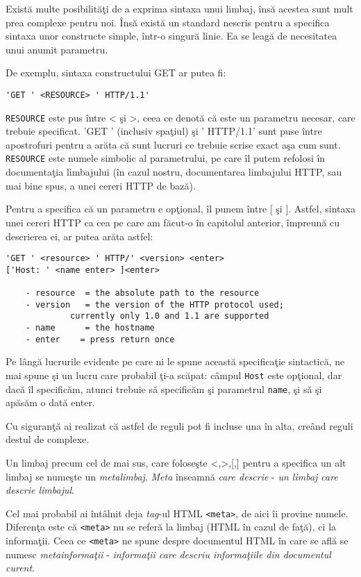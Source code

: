 Există multe posibilităţi de a exprima sintaxa unui limbaj, însă acestea
sunt mult prea complexe pentru noi. Însă există un standard nescris
pentru a specifica sintaxa unor constructe simple, într-o singură linie.
Ea se leagă de necesitatea unui anumit parametru.

De exemplu, sintaxa constructului GET ar putea fi:\\
\begin{verbatim}'GET ' <RESOURCE> ' HTTP/1.1'\end{verbatim}
\texttt{RESOURCE} este pus între < şi >, ceea ce denotă că
este un parametru necesar, care trebuie specificat.
'GET ' (inclusiv spaţiul) şi ' HTTP/1.1' sunt puse
între apostrofuri pentru a arăta că sunt lucruri
ce trebuie scrise exact aşa cum sunt. \texttt{RESOURCE}
este numele simbolic al parametrului, pe care îl putem
refolosi în documentaţia limbajului (în cazul nostru,
documentarea limbajului HTTP, sau mai bine spus, a unei
cereri HTTP de bază).

Pentru a specifica că un parametru e opţional, îl punem între [ şi ].
Astfel, sintaxa unei cereri HTTP ca cea pe care am făcut-o în capitolul
anterior, împreună cu descrierea ei, ar putea arăta astfel:
\begin{verbatim}
'GET ' <resource> ' HTTP/' <version> <enter>
['Host: ' <name enter> ]<enter>

	- resource	= the absolute path to the resource
	- version 	= the version of the HTTP protocol used;
             currently only 1.0 and 1.1 are supported
	- name	    = the hostname
	- enter    = press return once
\end{verbatim}

Pe lângă lucrurile evidente pe care ni le spune această specificaţie
sintactică, ne mai spune şi un lucru care probabil ţi-a scăpat:
câmpul \texttt{Host} este opţional, dar dacă îl specificăm, atunci
trebuie să specificăm şi parametrul \texttt{name}, şi să şi apăsăm o dată enter.

Cu siguranţă ai realizat că astfel de reguli pot fi incluse una în alta,
creând reguli destul de complexe.

Un limbaj precum cel de mai sus, care foloseşte <,>,[,] pentru a specifica
un alt limbaj se numeşte un \textsl{metalimbaj}. \textit{Meta} înseamnă
\textit{care descrie} - \textit{un limbaj care descrie limbajul}.



Cel mai probabil ai întâlnit deja \textsl{tag}-ul HTML \texttt{<meta>}, de aici
îi provine numele. Diferenţa este că \texttt{<meta>} nu se referă la limbaj (HTML
în cazul de faţă), ci la informaţii. Ceea ce \texttt{<meta>} ne spune despre
documentul HTML în care se află se numesc \textsl{metainformaţii} - \textit{informaţii
care descriu informaţiile din documentul curent}.

